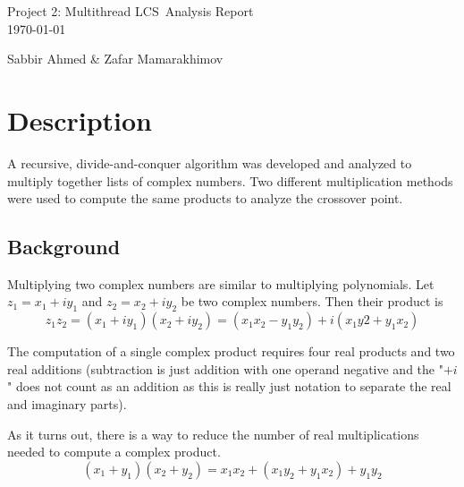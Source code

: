 \documentclass[usletter, 12pt]{article}
\newcommand{\project}{Project 2: Multithread LCS}
\newcommand{\members}{Sabbir Ahmed \& Zafar Mamarakhimov}
\begin{document}
    \begin{titlepage}

        \vspace*{\fill} %
        \begin{center}

            {\LARGE \project~Analysis Report}\\ [1.5cm]

            \today
            
            \vspace*{\fill}

            \members

        \end{center}
        \vspace*{\fill} %

    \end{titlepage}

    \section{Description}
    A recursive, divide-and-conquer algorithm was developed and analyzed to multiply together lists of complex numbers. Two different multiplication methods were used to compute the same products to analyze the crossover point.

        \subsection{Background}

        Multiplying two complex numbers are similar to multiplying polynomials. Let $z_{1}=x_{1}+iy_{1}$ and $z_{2}=x_{2}+iy_{2}$ be two complex numbers. Then their product is
            \[ z_{1}z_{2}=(x_{1}+iy_{1})(x_{2}+iy_{2})=(x_{1}x_{2}-y_{1}y_{2})+i(x_{1}y2+y_{1}x_{2}) \]

        The computation of a single complex product requires four real products and two real additions (subtraction is just addition with one operand negative and the "$+i$" does not count as an addition as this is really just notation to separate the real and imaginary parts).

        As it turns out, there is a way to reduce the number of real multiplications needed to compute a complex product.
            \[ (x_{1}+y_{1})(x_{2}+y_{2})=x_{1}x_{2}+(x_{1}y_{2}+y_{1}x_{2})+y_{1}y_{2} \]
\end{document}
